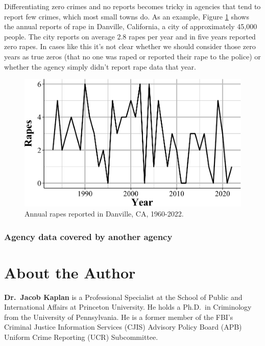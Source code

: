 \documentclass[
  12pt,
  openany]{book}
\begin{document}
Differentiating zero crimes and no reports becomes tricky in agencies that tend to report few crimes, which most small towns do. As an example, Figure \ref{fig:danvilleRape} shows the annual reports of rape in Danville, California, a city of approximately 45,000 people. The city reports on average 2.8 rapes per year and in five years reported zero rapes. In cases like this it's not clear whether we should consider those zero years as true zeros (that no one was raped or reported their rape to the police) or whether the agency simply didn't report rape data that year.

\begin{figure}

{\centering \includegraphics[width=0.9\linewidth]{index_files/figure-latex/danvilleRape-1} 

}

\caption{Annual rapes reported in Danville, CA, 1960-2022.}\label{fig:danvilleRape}
\end{figure}

\subsection{Agency data covered by another agency}\label{agency-data-covered-by-another-agency}

\chapter*{About the Author}\label{about-the-author}


\textbf{Dr.~Jacob Kaplan} is a Professional Specialist at the School of Public and International Affairs at Princeton University. He holds a Ph.D.~in Criminology from the University of Pennsylvania. He is a former member of the FBI's Criminal Justice Information Services (CJIS) Advisory Policy Board (APB) Uniform Crime Reporting (UCR) Subcommittee.
\end{document}

